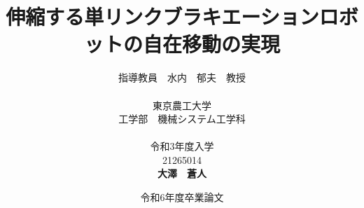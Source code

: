 


\usepackage{ikuo}%



\usepackage[dvipdfmx]{hyperref}  %
\usepackage{pxjahyper} %
\hypersetup{colorlinks=true}
\hypersetup{linkcolor=black}
\hypersetup{urlcolor=black}
\hypersetup{citecolor=black}

\usepackage{url} %

\newcommand{\FIGDIR}{./fig}        %


\date{令和6年度卒業論文}
\title{伸縮する単リンクブラキエーションロボットの自在移動の実現}
\author{指導教員　水内　郁夫　教授 \\
\ \\
東京農工大学　\\
工学部　機械システム工学科　\\
\ \\
令和3年度入学\\
21265014\\
{\bf 大澤　蒼人}}


\setlength{\baselineskip}{20pt}
\maketitle
\tableofcontents









% 
% 







